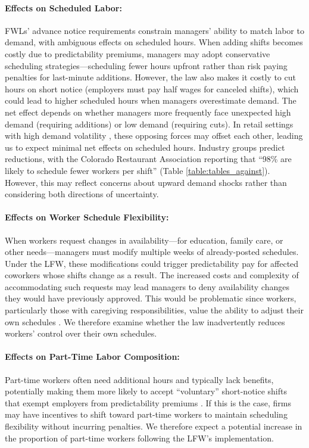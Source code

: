 \documentclass[letterpaper,11pt,leqno]{article}
\theoremstyle{paper}
\begin{document}
\paragraph{Effects on Scheduled Labor:}
FWLs' advance notice requirements constrain managers' ability to match labor to demand, with ambiguous effects on scheduled hours. When adding shifts becomes costly due to predictability premiums, managers may adopt conservative scheduling strategies—scheduling fewer hours upfront rather than risk paying penalties for last-minute additions. However, the law also makes it costly to cut hours on short notice (employers must pay half wages for canceled shifts), which could lead to higher scheduled hours when managers overestimate demand. The net effect depends on whether managers more frequently face unexpected high demand (requiring additions) or low demand (requiring cuts). In retail settings with high demand volatility \citep{netessine_traffic,kesavan_traffic,fisher_2021,retailAIScheduling2025}, these opposing forces may offset each other, leading us to expect minimal net effects on scheduled hours. Industry groups predict reductions, with the Colorado Restaurant Association reporting that ``98\% are likely to schedule fewer workers per shift'' (Table \ref{table:tables_against}). However, this may reflect concerns about upward demand shocks rather than considering both directions of uncertainty.


\paragraph{Effects on Worker Schedule Flexibility:}
When workers request changes in availability—for education, family care, or other needs—managers must modify multiple weeks of already-posted schedules. Under the LFW, these modifications could trigger predictability pay for affected coworkers whose shifts change as a result. The increased costs and complexity of accommodating such requests may lead managers to deny availability changes they would have previously approved. This would be problematic since workers, particularly those with caregiving responsibilities, value the ability to adjust their own schedules \citep{kelly2011changing,harknett2022who,mas2017valuing}. We therefore examine whether the law inadvertently reduces workers' control over their own schedules.

\paragraph{Effects on Part-Time Labor Composition:}
Part-time workers often need additional hours and typically lack benefits, potentially making them more likely to accept ``voluntary'' short-notice shifts that exempt employers from predictability premiums \citep{kalleberg2009precarious,lambert_2008}. If this is the case, firms may have incentives to shift toward part-time workers to maintain scheduling flexibility without incurring penalties. We therefore expect a potential increase in the proportion of part-time workers following the LFW's implementation. 
\end{document}
